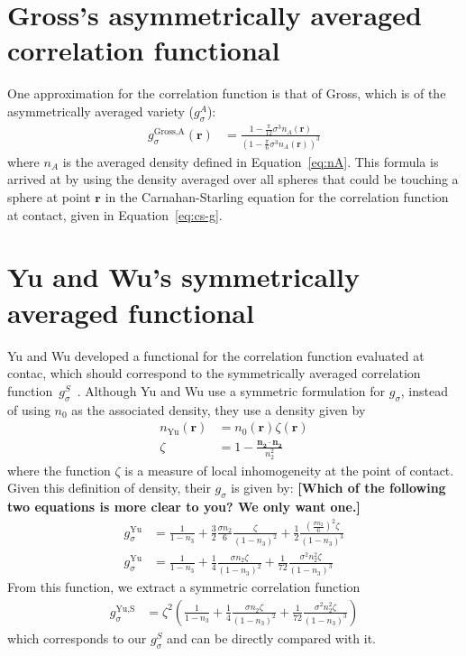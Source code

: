 \documentclass[letterpaper,twocolumn,amsmath,amssymb,jcp,10pt,aip]{revtex4-1}
\newcommand{\red}[1]{{\bf \color{red} #1}}
\newcommand{\rr}{\textbf{r}}
\newcommand{\fixme}[1]{\red{[#1]}}
\begin{document}
\section{Gross's asymmetrically averaged correlation functional}\label{sec:gross}
One approximation for the correlation function is that of
Gross\cite{gross2009density}, which is of the asymmetrically averaged
variety ($g_\sigma^A$):
\begin{align}
  g_\sigma^\text{Gross,A}(\rr) &= \frac{1 - \frac{\pi}{12}\sigma^3n_A(\rr)}{\left(1 -
    \frac{\pi}{6}\sigma^3n_A(\rr)\right)^3}
\end{align}
where $n_A$ is the averaged density defined in Equation~\ref{eq:nA}.
This formula is arrived at by using the density averaged over all
spheres that could be touching a sphere at point $\rr$ in the
Carnahan-Starling equation for the correlation function at contact,
given in Equation~\ref{eq:cs-g}.

\section{Yu and Wu's symmetrically averaged functional}\label{sec:yuwu}

Yu and Wu developed a functional for the correlation function
evaluated at contac, which should correspond to the symmetrically
averaged correlation
function~$g_\sigma^S$~\cite{yu2002fmt-dft-inhomogeneous-associating}.
Although Yu and Wu use a symmetric formulation for $g_\sigma$, instead
of using $n_0$ as the associated density, they use a density given by
\begin{align}
  n_\text{Yu}(\rr) &= n_0(\rr) \zeta(\rr) \\
  \zeta &= 1 - \frac{\mathbf{n_2}\cdot\mathbf{n_2}}{n_2^2}
\end{align}
where the function $\zeta$ is a measure of local inhomogeneity at the
point of contact.  Given this definition of density, their $g_\sigma$
is given by: \fixme{Which of the following two equations is more clear
  to you? We only want one.}
\begin{align}
  g_\sigma^\text{Yu} &= \frac{1}{1-n_3}
    + \frac32 \frac{\sigma n_2}{6}\frac{\zeta}{(1-n_3)^2}
    + \frac12 \frac{\left(\frac{\sigma n_2}{6}\right)^2 \zeta}{(1-n_3)^3}
    \\
  g_\sigma^\text{Yu} &= \frac{1}{1-n_3}
    + \frac14 \frac{\sigma n_2\zeta}{(1-n_3)^2}
    + \frac1{72} \frac{\sigma^2 n_2^2 \zeta}{(1-n_3)^3}
\end{align}
From this function, we extract a symmetric correlation function
\begin{align}
  g_\sigma^\text{Yu,S} &= \zeta^2\left(\frac{1}{1-n_3}
    + \frac14 \frac{\sigma n_2\zeta}{(1-n_3)^2}
    + \frac1{72} \frac{\sigma^2 n_2^2 \zeta}{(1-n_3)^3}\right)
\end{align}
which corresponds to our $g_\sigma^S$ and can be directly compared
with it.
\end{document}
